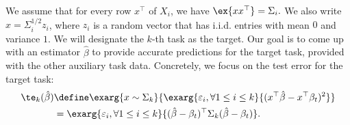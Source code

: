 




We assume that for every row $x^\top$ of $X_i$, we have $\ex{xx^{\top}} = \Sigma_i.$
We also write $x = \Sigma_i^{1/2} z_i$, where $z_i$ is a random vector that has i.i.d. entries with mean $0$ and variance $1$.
We will designate the $k$-th task as the target.
Our goal is to come up with an estimator $\hat{\beta}$ to provide accurate predictions for the target task, provided with the other auxiliary task data.
Concretely, we focus on the test error for the target task:
		\begin{align*}
			\te_k(\hat{\beta}) &\define \exarg{x \sim \Sigma_k}{\exarg{{\varepsilon_i, \forall 1\le i\le k}}{(x^{\top}\hat{\beta} - x^{\top}\beta_t)^2}} \\
			&= \exarg{\varepsilon_i, \forall 1\le i\le k}{(\hat{\beta} - \beta_t)^{\top}\Sigma_k(\hat{\beta} - \beta_t)}.
		\end{align*}

